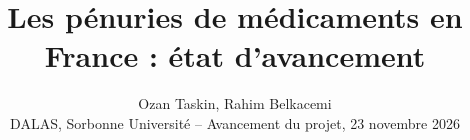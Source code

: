 \title{\vspace{-1.6cm}\textbf{Les pénuries de médicaments en France : état d'avancement}}
\author{Ozan Taskin, Rahim Belkacemi\\[2pt]
  \small DALAS, Sorbonne Université -- Avancement du projet, 23 novembre 2026}
\date{\vspace{-1.0cm}}
